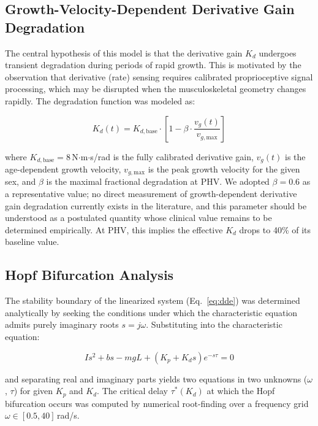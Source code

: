 \documentclass[12pt,a4paper]{article}
\begin{document}
\subsection{Growth-Velocity-Dependent Derivative Gain Degradation}

The central hypothesis of this model is that the derivative gain $K_d$ undergoes transient degradation during periods of rapid growth. This is motivated by the observation that derivative (rate) sensing requires calibrated proprioceptive signal processing, which may be disrupted when the musculoskeletal geometry changes rapidly. The degradation function was modeled as:

\begin{equation}
K_d(t) = K_{d,\text{base}} \cdot \left[1 - \beta \cdot \frac{v_g(t)}{v_{g,\text{max}}}\right]
\label{eq:kd_degrade}
\end{equation}

\noindent where $K_{d,\text{base}} = 8$\,N$\cdot$m$\cdot$s/rad is the fully calibrated derivative gain, $v_g(t)$ is the age-dependent growth velocity, $v_{g,\text{max}}$ is the peak growth velocity for the given sex, and $\beta$ is the maximal fractional degradation at PHV. We adopted $\beta = 0.6$ as a representative value; no direct measurement of growth-dependent derivative gain degradation currently exists in the literature, and this parameter should be understood as a postulated quantity whose clinical value remains to be determined empirically. At PHV, this implies the effective $K_d$ drops to 40\% of its baseline value.

\subsection{Hopf Bifurcation Analysis}

The stability boundary of the linearized system (Eq.~\ref{eq:dde}) was determined analytically by seeking the conditions under which the characteristic equation admits purely imaginary roots $s = j\omega$. Substituting into the characteristic equation:

\begin{equation}
Is^2 + bs - mgL + (K_p + K_d s)e^{-s\tau} = 0
\label{eq:char}
\end{equation}

\noindent and separating real and imaginary parts yields two equations in two unknowns ($\omega$, $\tau$) for given $K_p$ and $K_d$. The critical delay $\tau^*(K_d)$ at which the Hopf bifurcation occurs was computed by numerical root-finding over a frequency grid $\omega \in [0.5, 40]$\,rad/s.
\end{document}
